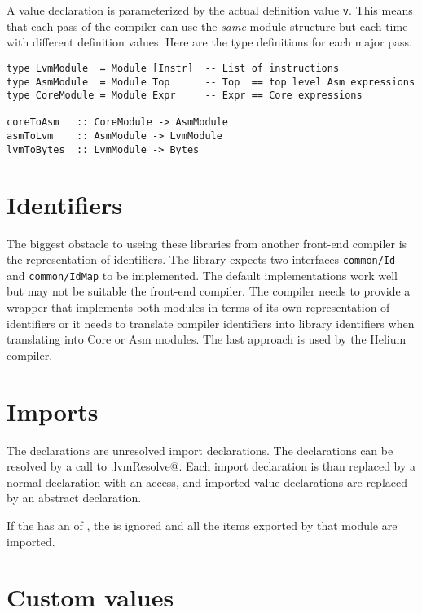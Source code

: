 \documentclass[a4paper,dvips]{article}
\newcommand{\code}[1]{\texttt{#1}}
\begin{document}
A value declaration is parameterized by the actual definition value \code{v}.
This means that each pass of the compiler can use the \emph{same} module
structure but each time with different definition values. Here are the type
definitions for each major pass.
{\small
\begin{verbatim}
type LvmModule  = Module [Instr]  -- List of instructions
type AsmModule  = Module Top      -- Top  == top level Asm expressions
type CoreModule = Module Expr     -- Expr == Core expressions

coreToAsm   :: CoreModule -> AsmModule
asmToLvm    :: AsmModule -> LvmModule
lvmToBytes  :: LvmModule -> Bytes
\end{verbatim}}

\section{Identifiers}

The biggest obstacle to useing these libraries from another front-end
compiler is the representation of identifiers. The library expects
two interfaces \code{common/Id} and \code{common/IdMap} to be implemented.
The default implementations work well but may not be suitable the
front-end compiler. The compiler needs to provide a wrapper that implements
both modules in terms of its own representation of identifiers or it
needs to translate compiler identifiers into library identifiers when
translating into Core or Asm modules. The last approach is used by the
Helium compiler.

\section{Imports}

The \verb@DeclImport@ declarations are unresolved import declarations.
The \verb@DeclImport@ declarations can
be resolved by a call to \verb@LvmResolve.lvmResolve@. Each import
declaration is than replaced by a normal declaration with
an \verb@Imported@ access, and imported value
declarations are replaced by an abstract declaration. 

If the \verb@DeclImport@ has an \verb@importKind@ of \verb@DeclKindModule@, the
\verb@importName@ is ignored and all the items exported by that module are
imported.

\section{Custom values}
\end{document}
